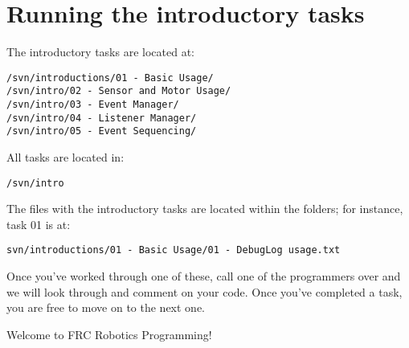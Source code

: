 \documentclass[a4paper]{article}
\begin{document}
\section{Running the introductory tasks}

The introductory tasks are located at: \begin{verbatim}/svn/introductions/01 - Basic Usage/
/svn/intro/02 - Sensor and Motor Usage/
/svn/intro/03 - Event Manager/
/svn/intro/04 - Listener Manager/
/svn/intro/05 - Event Sequencing/\end{verbatim}

All tasks are located in: \begin{verbatim}/svn/intro\end{verbatim}

The files with the introductory tasks are located within the folders; for instance, task 01 is at:\begin{verbatim}svn/introductions/01 - Basic Usage/01 - DebugLog usage.txt\end{verbatim}

Once you've worked through one of these, call one of the programmers over and we will look through and comment on your code. Once you've completed a task, you are free to move on to the next one. 

Welcome to FRC Robotics Programming!
\end{document}

